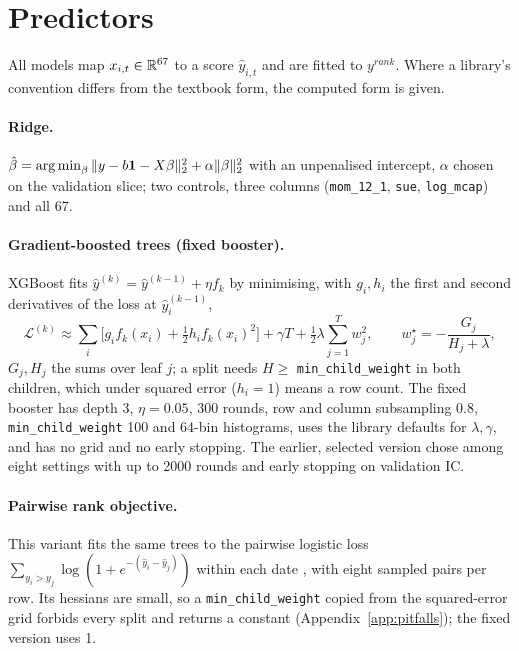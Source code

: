\section{Predictors}\label{sec:models}

All models map $x_{i,t}\in\mathbb{R}^{67}$ to a score $\hat y_{i,t}$ and are fitted to $y^{rank}$. Where a library's convention differs from the textbook form, the computed form is given.

\paragraph{Ridge.}
$\hat\beta=\operatorname*{arg\,min}_\beta\|y-b\mathbf 1-X\beta\|_2^2+\alpha\|\beta\|_2^2$ with an unpenalised intercept, $\alpha$ chosen on the validation slice; two controls, three columns (\texttt{mom\_12\_1}, \texttt{sue}, \texttt{log\_mcap}) and all 67.

\paragraph{Gradient-boosted trees (fixed booster).}
XGBoost \citep{chenguestrin2016} fits $\hat y^{(k)}=\hat y^{(k-1)}+\eta f_k$ by minimising, with $g_i,h_i$ the first and second derivatives of the loss at $\hat y^{(k-1)}_i$,
\begin{equation}\label{eq:xgb}
\mathcal L^{(k)}\approx\sum_i\Big[g_if_k(x_i)+\tfrac12h_if_k(x_i)^2\Big]+\gamma T+\tfrac12\lambda\sum_{j=1}^T w_j^2,\qquad
w_j^\star=-\frac{G_j}{H_j+\lambda},
\end{equation}
$G_j,H_j$ the sums over leaf $j$; a split needs $H\ge$ \texttt{min\_child\_weight} in both children, which under squared error ($h_i=1$) means a row count. The fixed booster has depth 3, $\eta=0.05$, 300 rounds, row and column subsampling 0.8, \texttt{min\_child\_weight} 100 and 64-bin histograms, uses the library defaults for $\lambda,\gamma$, and has no grid and no early stopping. The earlier, selected version chose among eight settings with up to 2000 rounds and early stopping on validation IC.

\paragraph{Pairwise rank objective.}
This variant fits the same trees to the pairwise logistic loss $\sum_{y_i>y_j}\log(1+e^{-(\hat y_i-\hat y_j)})$ within each date \citep{burges2005}, with eight sampled pairs per row. Its hessians are small, so a \texttt{min\_child\_weight} copied from the squared-error grid forbids every split and returns a constant (Appendix~\ref{app:pitfalls}); the fixed version uses 1.

